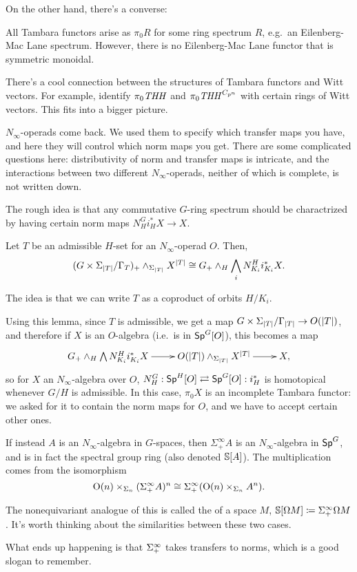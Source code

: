 On the other hand, there's a converse:
\begin{thm}
All Tambara functors arise as $\pi_0R$ for some ring spectrum $R$, e.g.\ an Eilenberg-Mac Lane spectrum. However,
there is no Eilenberg-Mac Lane functor that is symmetric monoidal.
\end{thm}
\begin{rem}
There's a cool connection between the structures of Tambara functors and Witt vectors. For example,
 identify $\pi_0\mathit{THH}$ and $\pi_0\mathit{THH}^{C_{p^n}}$ with certain rings of Witt vectors. This
fits into a bigger picture.
\end{rem}
$N_\infty$-operads come back. We used them to specify which transfer maps you have, and here they will control
which norm maps you get. There are some complicated questions here: distributivity of norm and transfer maps is
intricate, and the interactions between two different $N_\infty$-operads, neither of which is complete, is not
written down.

The rough idea is that any commutative $G$-ring spectrum should be charactrized by having certain norm maps
$N_H^Gi_H^*X\to X$.
\begin{lem}
Let $T$ be an admissible $H$-set for an $N_\infty$-operad $O$. Then,
\[(G\times\Sigma_{\lvert T\rvert}/\Gamma_T)_+\wedge_{\Sigma_{\lvert T\rvert}} X^{\lvert T\rvert} \cong G_+\wedge_H \bigwedge_i
N_{K_i}^Hi_{K_i}^*X.\]
\end{lem}
The idea is that we can write $T$ as a coproduct of orbits $H/K_i$.

Using this lemma, since $T$ is admissible, we get a map $G\times\Sigma_{\lvert T\rvert}/\Gamma_{\lvert T\rvert}\to O(\lvert T\rvert)$, and
therefore if $X$ is an $O$-algebra (i.e.\ is in $\mathsf{Sp}^G[O]$), this becomes a map
\[\xymatrix{
	G_+\wedge_H\bigwedge N_{K_i}^H i_{K_i}^*X\ar[r] & O(\abs T)\wedge_{\Sigma_{\abs T}} X^{\abs T}\ar[r] & X,
}\]
so for $X$ an $N_\infty$-algebra over $O$, $N_H^G: \mathsf{Sp}^H[O]\rightleftarrows \mathsf{Sp}^G[O]: i_H^*$ is homotopical
whenever $G/H$ is admissible. In this case, $\pi_0X$ is an incomplete Tambara functor: we asked for it to contain
the norm maps for $O$, and we have to accept certain other ones.

If instead $A$ is an $N_\infty$-algebra in $G$-spaces, then $\Sigma_+^\infty A$ is an $N_\infty$-algebra in
$\mathsf{Sp}^G$, and is in fact the spectral group ring (also denoted $\mathbb S[A]$). The multiplication comes from the
isomorphism
\[\mathrm O(n)\times_{\Sigma_n} (\Sigma^\infty_+A)^n\cong \Sigma^\infty_+(\mathrm O(n)\times_{\Sigma_n} A^n).\]
\begin{rem}
The nonequivariant analogue of this is called the  of a space $M$, $\mathbb S[\Omega
M]\coloneqq \Sigma_+^\infty \Omega M$. It's worth thinking about the similarities between these two cases.
\end{rem}
What ends up happening is that $\Sigma^\infty_+$ takes transfers to norms, which is a good slogan to remember.

